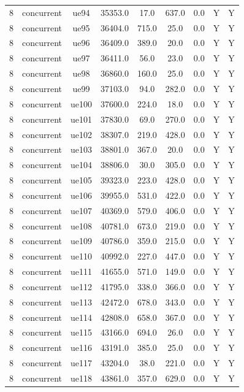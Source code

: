 \begin{table}[ht]
\begin{tabular}{|c|c|c|c|c|c|c|c|c|}
8 & concurrent & ue94 & 35353.0 & 17.0 & 637.0 & 0.0 & Y & Y \\
8 & concurrent & ue95 & 36404.0 & 715.0 & 25.0 & 0.0 & Y & Y \\
8 & concurrent & ue96 & 36409.0 & 389.0 & 20.0 & 0.0 & Y & Y \\
8 & concurrent & ue97 & 36411.0 & 56.0 & 23.0 & 0.0 & Y & Y \\
8 & concurrent & ue98 & 36860.0 & 160.0 & 25.0 & 0.0 & Y & Y \\
8 & concurrent & ue99 & 37103.0 & 94.0 & 282.0 & 0.0 & Y & Y \\
8 & concurrent & ue100 & 37600.0 & 224.0 & 18.0 & 0.0 & Y & Y \\
8 & concurrent & ue101 & 37830.0 & 69.0 & 270.0 & 0.0 & Y & Y \\
8 & concurrent & ue102 & 38307.0 & 219.0 & 428.0 & 0.0 & Y & Y \\
8 & concurrent & ue103 & 38801.0 & 367.0 & 20.0 & 0.0 & Y & Y \\
8 & concurrent & ue104 & 38806.0 & 30.0 & 305.0 & 0.0 & Y & Y \\
8 & concurrent & ue105 & 39323.0 & 223.0 & 428.0 & 0.0 & Y & Y \\
8 & concurrent & ue106 & 39955.0 & 531.0 & 422.0 & 0.0 & Y & Y \\
8 & concurrent & ue107 & 40369.0 & 579.0 & 406.0 & 0.0 & Y & Y \\
8 & concurrent & ue108 & 40781.0 & 673.0 & 219.0 & 0.0 & Y & Y \\
8 & concurrent & ue109 & 40786.0 & 359.0 & 215.0 & 0.0 & Y & Y \\
8 & concurrent & ue110 & 40992.0 & 227.0 & 447.0 & 0.0 & Y & Y \\
8 & concurrent & ue111 & 41655.0 & 571.0 & 149.0 & 0.0 & Y & Y \\
8 & concurrent & ue112 & 41795.0 & 338.0 & 366.0 & 0.0 & Y & Y \\
8 & concurrent & ue113 & 42472.0 & 678.0 & 343.0 & 0.0 & Y & Y \\
8 & concurrent & ue114 & 42808.0 & 658.0 & 367.0 & 0.0 & Y & Y \\
8 & concurrent & ue115 & 43166.0 & 694.0 & 26.0 & 0.0 & Y & Y \\
8 & concurrent & ue116 & 43191.0 & 385.0 & 25.0 & 0.0 & Y & Y \\
8 & concurrent & ue117 & 43204.0 & 38.0 & 221.0 & 0.0 & Y & Y \\
8 & concurrent & ue118 & 43861.0 & 357.0 & 629.0 & 0.0 & Y & Y \\

\end{tabular}
\end{table}
